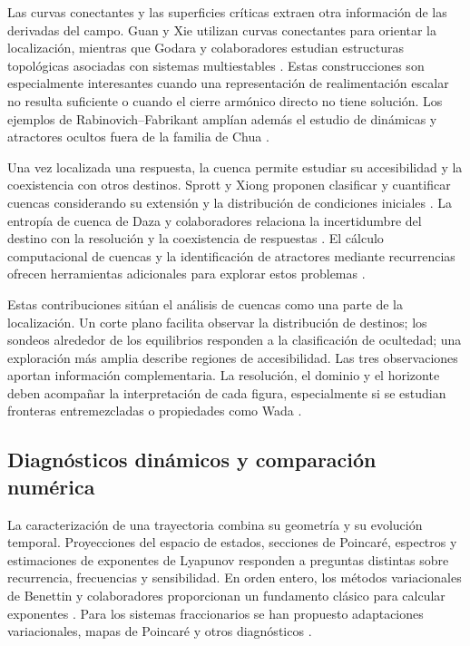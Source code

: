 Las curvas conectantes y las superficies críticas extraen otra información
de las derivadas del campo. Guan y Xie utilizan curvas conectantes para
orientar la localización, mientras que Godara y colaboradores estudian
estructuras topológicas asociadas con sistemas multiestables
\cite{GuanXie2021Connecting,GodaraEtAl2018CriticalSurfaces}.
Estas construcciones son especialmente interesantes cuando una
representación de realimentación escalar no resulta suficiente o cuando el
cierre armónico directo no tiene solución. Los ejemplos de
Rabinovich--Fabrikant amplían además el estudio de dinámicas y atractores
ocultos fuera de la familia de Chua \cite{Danca2017HiddenFO}.

Una vez localizada una respuesta, la cuenca permite estudiar su accesibilidad
y la coexistencia con otros destinos. Sprott y Xiong proponen clasificar y
cuantificar cuencas considerando su extensión y la distribución de
condiciones iniciales \cite{SprottXiong2015Basins}. La entropía de cuenca
de Daza y colaboradores relaciona la incertidumbre del destino con la
resolución y la coexistencia de respuestas
\cite{DazaEtAl2016BasinEntropy}. El cálculo computacional de cuencas y la
identificación de atractores mediante recurrencias ofrecen herramientas
adicionales para explorar estos problemas \cite{datseris2022}.

Estas contribuciones sitúan el análisis de cuencas como una parte de la
localización. Un corte plano facilita observar la distribución de destinos;
los sondeos alrededor de los equilibrios responden a la clasificación de
ocultedad; una exploración más amplia describe regiones de accesibilidad.
Las tres observaciones aportan información complementaria. La resolución,
el dominio y el horizonte deben acompañar la interpretación de cada
figura, especialmente si se estudian fronteras entremezcladas o propiedades
como Wada \cite{DazaEtAl2015Wada}.

\subsection{Diagnósticos dinámicos y comparación numérica}

La caracterización de una trayectoria combina su geometría y su evolución
temporal. Proyecciones del espacio de estados, secciones de Poincaré,
espectros y estimaciones de exponentes de Lyapunov responden a preguntas
distintas sobre recurrencia, frecuencias y sensibilidad. En orden entero,
los métodos variacionales de Benettin y colaboradores proporcionan un
fundamento clásico para calcular exponentes
\cite{Benettin1980a,Benettin1980b}. Para los sistemas fraccionarios se han
propuesto adaptaciones variacionales, mapas de Poincaré y otros
diagnósticos \cite{DancaKuznetsov2018Lyapunov,fischer2020,ClementeLopezEtAl2022Poincare}.

